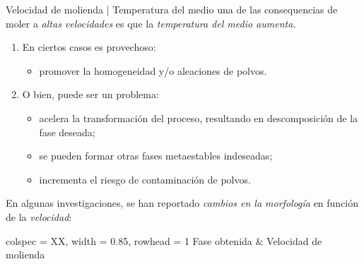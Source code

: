 \documentclass[%
spanish,
    progressbar=head,
background=dark,
subsectionpage
]{beamer}
\begin{document}
\begin{frame}{Velocidad de molienda | Temperatura del medio}
    una de las consequencias de moler a \emph{altas velocidades} es que la \emph{temperatura del medio aumenta.}
    \begin{enumerate}
            \item En ciertos casos es provechoso:
            \begin{itemize}
                \item promover la homogeneidad y/o aleaciones de polvos.
            \end{itemize}
            \item O bien, puede ser un problema:
            \begin{itemize}
                \item acelera la transformación del proceso, resultando en descomposición de la fase deseada;
                \item se pueden formar otras fases metaestables indeseadas;
                \item incrementa el riesgo de contaminación de polvos.
            \end{itemize}
        \end{enumerate}
\end{frame}

\begin{frame}
    En algunas investigaciones, se han reportado \emph{cambios en la morfología} en función de la \emph{velocidad}:\autocite{calka1991universal} 

    \begin{longtblr}[caption={Relación de la velocidad con las fases obtenidas}]{colspec = {XX}, width = 0.85\linewidth, rowhead = 1}
    \toprule 
    Fase obtenida & Velocidad de molienda \\

        
    \end{longtblr}
\end{frame}


\begin{frame}
\printbibheading
\printbibliography[type=book,heading=subbibliography,title={Book Sources}]
\printbibliography[nottype=book,heading=subbibliography,title={Other Sources}]
\end{frame}
\end{document}
